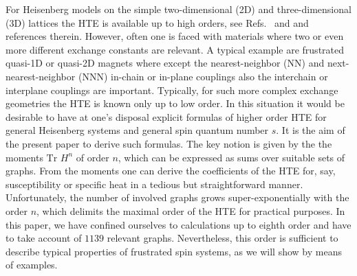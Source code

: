 \documentclass[aps,twocolumn,groupedaddress]{revtex4}
\begin{document}
For Heisenberg models on the simple two-dimensional (2D) and
three-dimensional (3D) lattices the HTE is available up to high
orders, see Refs.~ and  and references
therein. However, often one is faced with materials where two or
even more different exchange constants are relevant. A typical
example are frustrated quasi-1D or quasi-2D magnets where except the
nearest-neighbor (NN) and next-nearest-neighbor (NNN) in-chain or
in-plane couplings also the interchain  or interplane  couplings
are important.
Typically, for such more complex exchange geometries
the HTE is known only up to low order. In this situation it would be
desirable to have at one's disposal explicit formulas of higher
order HTE for general Heisenberg systems and general spin quantum
number $s$.  It is the aim of the present paper to derive such
formulas. The key notion is given by the the moments $\mbox{Tr }H^n$
of order $n$, which can be expressed as sums over suitable sets of
graphs. From the moments one can derive the coefficients of the HTE
for, say, susceptibility or specific heat in a tedious but straightforward manner.
Unfortunately, the number of involved graphs grows
super-exponentially with the order $n$, which delimits the maximal
order of the HTE for practical purposes. In this paper, we have
confined ourselves to calculations up to eighth order and have to
take account of $1139$ relevant graphs. Nevertheless, this order is
sufficient to describe typical properties of frustrated spin
systems, as we will show by means of examples.
\end{document}
